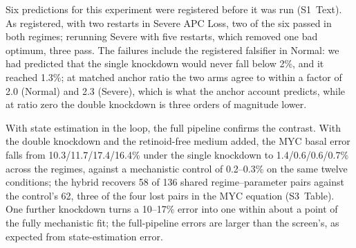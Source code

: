 Six predictions for this experiment were registered before it was run (S1~Text).
As registered, with two restarts in Severe APC Loss, two of the six passed in
both regimes; rerunning Severe with five restarts, which removed one bad
optimum, three pass. The failures include the registered falsifier in Normal:
we had predicted that the single knockdown would never fall below 2\%, and it
reached 1.3\%; at matched anchor ratio the two \bcat{} arms agree to within a
factor of 2.0 (Normal) and 2.3 (Severe), which is what the anchor account
predicts, while at ratio zero the double knockdown is three orders of magnitude
lower.

With state estimation in the loop, the full pipeline confirms the contrast. With
the double knockdown and the retinoid-free medium added, the MYC basal error
falls from 10.3/11.7/17.4/16.4\% under the single knockdown to
1.4/0.6/0.6/0.7\% across the regimes, against a mechanistic control of
0.2--0.3\% on the same twelve conditions; the hybrid recovers 58 of 136 shared
regime--parameter pairs against the control's 62, three of the four lost pairs
in the MYC equation (S3~Table). One further knockdown turns a 10--17\% error
into one within about a point of the fully mechanistic fit; the full-pipeline errors
are larger than the screen's, as expected from state-estimation error.

